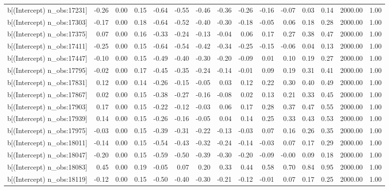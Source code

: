 \begin{table}[ht]
\begin{tabular}{rrrrrrrrrrrrrrr}
  b[(Intercept) n\_obs:17231] & -0.26 & 0.00 & 0.15 & -0.64 & -0.55 & -0.46 & -0.36 & -0.26 & -0.16 & -0.07 & 0.03 & 0.14 & 2000.00 & 1.00 \\ 
  b[(Intercept) n\_obs:17303] & -0.17 & 0.00 & 0.18 & -0.64 & -0.52 & -0.40 & -0.30 & -0.18 & -0.05 & 0.06 & 0.18 & 0.28 & 2000.00 & 1.00 \\ 
  b[(Intercept) n\_obs:17375] & 0.07 & 0.00 & 0.16 & -0.33 & -0.24 & -0.13 & -0.04 & 0.06 & 0.17 & 0.27 & 0.38 & 0.47 & 2000.00 & 1.00 \\ 
  b[(Intercept) n\_obs:17411] & -0.25 & 0.00 & 0.15 & -0.64 & -0.54 & -0.42 & -0.34 & -0.25 & -0.15 & -0.06 & 0.04 & 0.13 & 2000.00 & 1.00 \\ 
  b[(Intercept) n\_obs:17447] & -0.10 & 0.00 & 0.15 & -0.49 & -0.40 & -0.30 & -0.20 & -0.09 & 0.01 & 0.10 & 0.19 & 0.27 & 2000.00 & 1.00 \\ 
  b[(Intercept) n\_obs:17795] & -0.02 & 0.00 & 0.17 & -0.45 & -0.35 & -0.24 & -0.14 & -0.01 & 0.09 & 0.19 & 0.31 & 0.41 & 2000.00 & 1.00 \\ 
  b[(Intercept) n\_obs:17831] & 0.12 & 0.00 & 0.14 & -0.26 & -0.15 & -0.05 & 0.03 & 0.12 & 0.22 & 0.30 & 0.40 & 0.49 & 2000.00 & 1.00 \\ 
  b[(Intercept) n\_obs:17867] & 0.02 & 0.00 & 0.15 & -0.38 & -0.27 & -0.16 & -0.08 & 0.02 & 0.13 & 0.21 & 0.33 & 0.45 & 2000.00 & 1.00 \\ 
  b[(Intercept) n\_obs:17903] & 0.17 & 0.00 & 0.15 & -0.22 & -0.12 & -0.03 & 0.06 & 0.17 & 0.28 & 0.37 & 0.47 & 0.55 & 2000.00 & 1.00 \\ 
  b[(Intercept) n\_obs:17939] & 0.14 & 0.00 & 0.15 & -0.26 & -0.16 & -0.05 & 0.04 & 0.14 & 0.25 & 0.33 & 0.43 & 0.53 & 2000.00 & 1.00 \\ 
  b[(Intercept) n\_obs:17975] & -0.03 & 0.00 & 0.15 & -0.39 & -0.31 & -0.22 & -0.13 & -0.03 & 0.07 & 0.16 & 0.26 & 0.35 & 2000.00 & 1.00 \\ 
  b[(Intercept) n\_obs:18011] & -0.14 & 0.00 & 0.15 & -0.54 & -0.43 & -0.32 & -0.24 & -0.14 & -0.03 & 0.07 & 0.17 & 0.29 & 2000.00 & 1.00 \\ 
  b[(Intercept) n\_obs:18047] & -0.20 & 0.00 & 0.15 & -0.59 & -0.50 & -0.39 & -0.30 & -0.20 & -0.09 & -0.00 & 0.09 & 0.18 & 2000.00 & 1.00 \\ 
  b[(Intercept) n\_obs:18083] & 0.45 & 0.00 & 0.19 & -0.05 & 0.07 & 0.20 & 0.33 & 0.44 & 0.58 & 0.70 & 0.84 & 0.95 & 2000.00 & 1.00 \\ 
  b[(Intercept) n\_obs:18119] & -0.12 & 0.00 & 0.15 & -0.50 & -0.40 & -0.30 & -0.21 & -0.12 & -0.01 & 0.07 & 0.17 & 0.25 & 2000.00 & 1.00 \\ 

\end{tabular}
\end{table}
